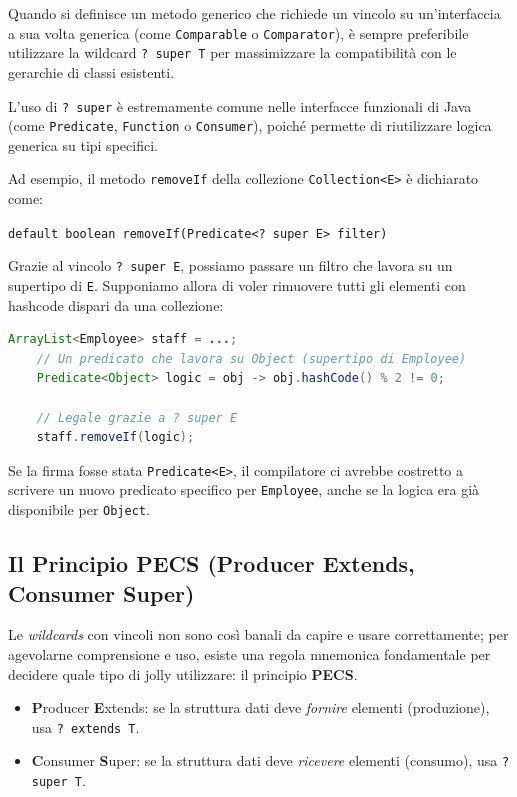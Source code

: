 \begin{bestpractice}
    Quando si definisce un metodo generico che richiede un vincolo su un'interfaccia a sua volta generica (come \texttt{Comparable} o \texttt{Comparator}), è sempre preferibile utilizzare la wildcard \texttt{? super T} per massimizzare la compatibilità con le gerarchie di classi esistenti.
\end{bestpractice}

L'uso di \texttt{? super} è estremamente comune nelle interfacce funzionali di Java (come \texttt{Predicate}, \texttt{Function} o \texttt{Consumer}), poiché permette di riutilizzare logica generica su tipi specifici.

Ad esempio, il metodo \texttt{removeIf} della collezione \texttt{Collection<E>} è dichiarato come:
\begin{center}
\texttt{default boolean removeIf(Predicate<? super E> filter)}
\end{center}


Grazie al vincolo \texttt{? super E}, possiamo passare un filtro che lavora su un supertipo di \texttt{E}. Supponiamo allora di voler rimuovere tutti gli elementi con hashcode dispari da una collezione:
\begin{lstlisting}[language=Java]
    ArrayList<Employee> staff = ...;
    // Un predicato che lavora su Object (supertipo di Employee)
    Predicate<Object> logic = obj -> obj.hashCode() % 2 != 0;

    // Legale grazie a ? super E
    staff.removeIf(logic); 
\end{lstlisting}
Se la firma fosse stata \texttt{Predicate<E>}, il compilatore ci avrebbe costretto a scrivere un nuovo predicato specifico per \texttt{Employee}, anche se la logica era già disponibile per \texttt{Object}.

\subsection{Il Principio PECS (Producer Extends, Consumer Super)}

Le \textit{wildcards} con vincoli non sono così banali da capire e usare correttamente; per agevolarne comprensione e uso, esiste una regola mnemonica fondamentale per decidere quale tipo di jolly utilizzare: il principio \textbf{PECS}. 

\begin{tip}
    \begin{itemize}
        \item \textbf{P}roducer \textbf{E}xtends: se la struttura dati deve \textit{fornire} elementi (produzione), usa \texttt{? extends T}.
        \item \textbf{C}onsumer \textbf{S}uper: se la struttura dati deve \textit{ricevere} elementi (consumo), usa \texttt{? super T}.
    \end{itemize}
\end{tip}

